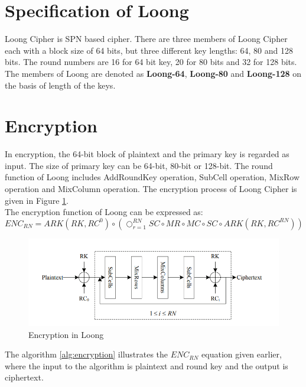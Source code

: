 \documentclass[preprint]{transcrypto}
\begin{document}
\section{Specification of Loong}
Loong Cipher is SPN based cipher. There are three members of Loong Cipher each with a block size of 64 bits, but three different key lengths: 64, 80 and 128 bits. The round numbers are 16 for 64 bit key, 20 for 80 bits and 32 for 128 bits. The members of Loong are denoted as \textbf{Loong-64}, \textbf{Loong-80} and \textbf{Loong-128} on the basis of length of the keys.


\section{Encryption}
In encryption, the 64-bit block of plaintext and the primary key is regarded as input. The size of primary key can be 64-bit, 80-bit or 128-bit. 
The round function of Loong includes AddRoundKey operation, SubCell operation, MixRow operation and MixColumn operation. The encryption process of Loong Cipher is given in Figure \ref{figure:encryption}.\\
The encryption function of Loong can be expressed as:
\begin{equation}
    ENC_{RN} = ARK(RK, RC^{0}) \circ (\bigcirc_{r = 1}^{RN} SC \circ MR \circ MC \circ SC \circ ARK(RK, RC^{RN}))
\end{equation}
\begin{figure}[H]
	\centering
	\includegraphics[width=12cm]{encrypt.png}
	\caption{Encryption in Loong}
	\label{figure:encryption}
\end{figure}
The algorithm \ref{alg:encryption} illustrates the $ENC_{RN}$ equation given earlier, where the input to the algorithm is plaintext and round key and the output is ciphertext.
\end{document}

